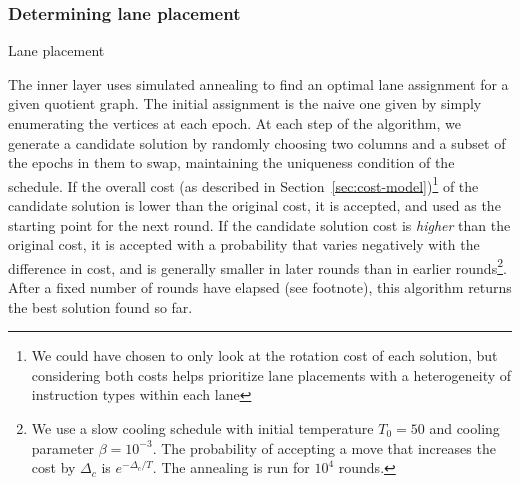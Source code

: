 \subsubsection*{Determining lane placement}
\begin{algorithm}
    

    \caption{Lane placement}\label{alg:lane-placement}
    
\end{algorithm}
The inner layer uses simulated annealing to find an optimal lane assignment for a given quotient graph.
The initial assignment is the naive one given by simply enumerating the vertices at each epoch.
At each step of the algorithm, we generate a candidate solution by randomly choosing two columns and a subset of the epochs in them to swap, maintaining the uniqueness condition of the schedule.
If the overall cost (as described in Section~\ref{sec:cost-model})\footnote{We could have chosen to only look at the rotation cost of each solution, but considering both costs helps prioritize lane placements with a heterogeneity of instruction types within each lane} of the candidate solution is lower than the original cost, it is accepted, and used as the starting point for the next round.
If the candidate solution cost is {\em higher} than the original cost, it is accepted with a probability that varies negatively with the difference in cost, and is generally smaller in later rounds than in earlier rounds\footnote{We use a slow cooling schedule with initial temperature $T_0=50$ and cooling parameter $\beta=10^{-3}$. The probability of accepting a move that increases the cost by $\Delta_c$ is $e^{-\Delta_c/T}$. The annealing is run for $10^4$ rounds.}.
After a fixed number of rounds have elapsed (see footnote), this algorithm returns the best solution found so far.

